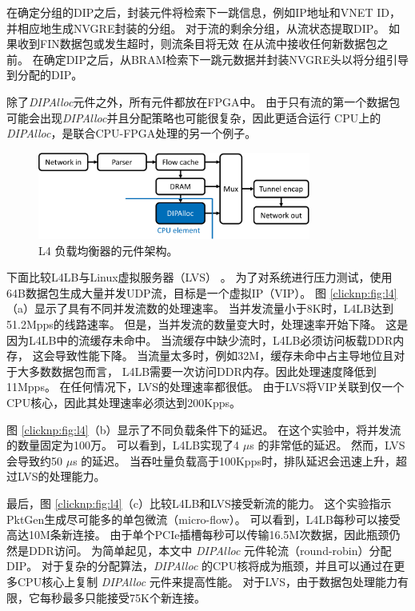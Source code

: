 在确定分组的DIP之后，封装元件将检索下一跳信息，例如IP地址和VNET ID，并相应地生成NVGRE封装的分组。
对于流的剩余分组，从流状态提取DIP。
如果收到FIN数据包或发生超时，则流条目将无效
在从流中接收任何新数据包之前。
在确定DIP之后，从BRAM检索下一跳元数据并封装NVGRE头以将分组引导到分配的DIP。

除了\textit {DIPAlloc}元件之外，所有元件都放在FPGA中。
由于只有流的第一个数据包可能会出现\textit {DIPAlloc}并且分配策略也可能很复杂，因此更适合运行
CPU上的\textit {DIPAlloc}，是联合CPU-FPGA处理的另一个例子。


\begin{figure}[htbp]
	\centering
	\includegraphics[width=0.8\textwidth]{image/L4LoadBalancer}
	\caption{L4 负载均衡器的元件架构。}
	\label{clicknp:fig:L4LB}
\end{figure}


下面比较L4LB与Linux虚拟服务器（LVS） \cite {lvs}。
为了对系统进行压力测试，使用64B数据包生成大量并发UDP流，目标是一个虚拟IP（VIP）。
图 \ref {clicknp:fig:l4}（a）显示了具有不同并发流数的处理速率。
当并发流量小于8K时，L4LB达到51.2Mpps的线路速率。
但是，当并发流的数量变大时，处理速率开始下降。
这是因为L4LB中的流缓存未命中。
当流缓存中缺少流时，L4LB必须访问板载DDR内存，
这会导致性能下降。
当流量太多时，例如32M，缓存未命中占主导地位且对于大多数数据包而言，
L4LB需要一次访问DDR内存。因此处理速度降低到11Mpps。
在任何情况下，LVS的处理速率都很低。
由于LVS将VIP关联到仅一个CPU核心，因此其处理速率必须达到200Kpps。

图 \ref {clicknp:fig:l4}（b）显示了不同负载条件下的延迟。
在这个实验中，将并发流的数量固定为100万。
可以看到，L4LB实现了4 $\mu$s 的非常低的延迟。
然而，LVS会导致约50 $\mu$s 的延迟。
当吞吐量负载高于100Kpps时，排队延迟会迅速上升，超过LVS的处理能力。

最后，图 \ref {clicknp:fig:l4}（c）比较L4LB和LVS接受新流的能力。
这个实验指示PktGen生成尽可能多的单包微流（micro-flow）。
可以看到，L4LB每秒可以接受高达10M条新连接。
由于单个PCIe插槽每秒可以传输16.5M次数据，因此瓶颈仍然是DDR访问。
为简单起见，本文中 \textit {DIPAlloc} 元件轮流（round-robin）分配DIP。
对于复杂的分配算法，\textit {DIPAlloc} 的CPU核将成为瓶颈，并且可以通过在更多CPU核心上复制 \textit {DIPAlloc} 元件来提高性能。
对于LVS，由于数据包处理能力有限，它每秒最多只能接受75K个新连接。


